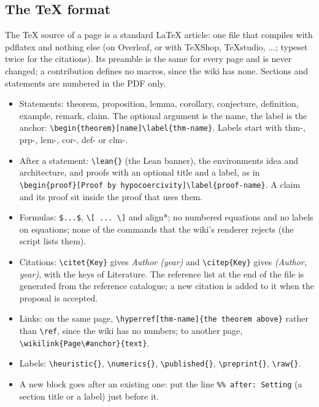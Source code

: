 \documentclass[11pt]{article}
\theoremstyle{definition}
\theoremstyle{remark}
\newcommand{\wikilink}[2]{\ifx\relax#2\relax#1\else#2\fi}
\newcommand{\nowikicode}[1]{\texttt{\frenchspacing#1}}
\begin{document}
\subsection{The TeX format}
The TeX source of a page is a standard LaTeX article: one file that compiles with pdflatex and nothing else (on Overleaf, or with TeXShop, TeXstudio, ...; typeset twice for the citations). Its preamble is the same for every page and is never changed; a contribution defines no macros, since the wiki has none. Sections and statements are numbered in the PDF only.
\begin{itemize}
  \item Statements: theorem, proposition, lemma, corollary, conjecture, definition, example, remark, claim. The optional argument is the name, the label is the anchor: \nowikicode{\textbackslash{}begin\{theorem\}\allowbreak{}[name]\textbackslash{}label\{thm-name\}}. Labels start with thm-, prp-, lem-, cor-, def- or clm-.
  \item After a statement: \nowikicode{\textbackslash{}lean\{\}} (the Lean banner), the environments idea and architecture, and proofs with an optional title and a label, as in \nowikicode{\textbackslash{}begin\{proof\}\allowbreak{}[Proof by hypocoercivity]\textbackslash{}label\{proof-name\}}. A claim and its proof sit inside the proof that uses them.
  \item Formulas: \nowikicode{\$...\$}, \nowikicode{\textbackslash{}[ ... \textbackslash{}]} and align*; no numbered equations and no labels on equations; none of the commands that the wiki's renderer rejects (the script lists them).
  \item Citations: \nowikicode{\textbackslash{}citet\{Key\}} gives \emph{Author (year)} and \nowikicode{\textbackslash{}citep\{Key\}} gives \emph{(Author, year)}, with the keys of \wikilink{Literature}{}. The reference list at the end of the file is generated from the reference catalogue; a new citation is added to it when the proposal is accepted.
  \item Links: on the same page, \nowikicode{\textbackslash{}hyperref[thm-name]\{the theorem above\}} rather than \nowikicode{\textbackslash{}ref}, since the wiki has no numbers; to another page, \nowikicode{\textbackslash{}wikilink\{Page\textbackslash{}\#\allowbreak{}anchor\}\allowbreak{}\{text\}}.
  \item Labels: \nowikicode{\textbackslash{}heuristic\{\}}, \nowikicode{\textbackslash{}numerics\{\}}, \nowikicode{\textbackslash{}published\{\}}, \nowikicode{\textbackslash{}preprint\{\}}, \nowikicode{\textbackslash{}raw\{\}}.
  \item A new block goes after an existing one: put the line \nowikicode{\%\% after: Setting} (a section title or a label) just before it.
\end{itemize}
\end{document}
